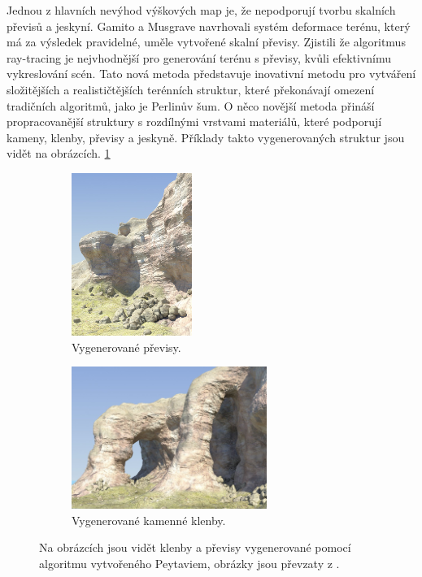 Jednou z hlavních nevýhod výškových map je, že nepodporují tvorbu skalních převisů a jeskyní. Gamito a Musgrave \cite{Gamito2001ProceduralLW} navrhovali systém deformace terénu, který má za výsledek pravidelné, uměle vytvořené skalní převisy. Zjistili že algoritmus ray-tracing je nejvhodnější pro generování terénu s převisy, kvůli efektivnímu vykreslování scén. Tato nová metoda představuje inovativní metodu pro vytváření složitějších a realističtějších terénních struktur, které překonávají omezení tradičních algoritmů, jako je Perlinův šum. O něco novější metoda \cite{Peytavie09} přináší propracovanější struktury s rozdílnými vrstvami materiálů, které podporují kameny, klenby, převisy a jeskyně. Příklady takto vygenerovaných struktur jsou vidět na obrázcích. \ref{PeytavieGen}

\begin{figure}[H]
	\centering
	\begin{subfigure}{0.475\textwidth}
		\centering
		\includegraphics[scale=1]{obrazky-figures/Overhang.png}
		\caption{Vygenerované převisy.}
	\end{subfigure}
	\begin{subfigure}{0.475\textwidth}
		\centering
		\includegraphics[scale=1]{obrazky-figures/Arches.png}
		\caption{Vygenerované kamenné klenby.}
	\end{subfigure}
	\caption{Na obrázcích jsou vidět klenby a převisy vygenerované pomocí algoritmu vytvořeného Peytaviem, obrázky jsou převzaty z \cite{Peytavie09}.}
	\label{PeytavieGen}
\end{figure}

